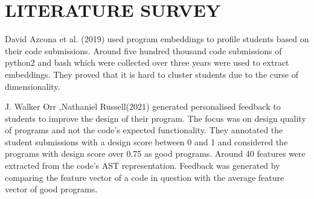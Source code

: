
\chapter{LITERATURE SURVEY} %

David Azcona et al. (2019) \cite{A} used program embeddings to profile students based on their code submissions. Around five hundred thousand code submissions of python2 and bash which were collected over three years were used to extract embeddings. They proved that it is hard to cluster students due to the curse of dimensionality. 

J. Walker Orr ,Nathaniel Russell(2021)\cite{T} generated personalised feedback to students to improve the design of their program. The focus was on design quality of programs and not the code's expected functionality. They annotated the student submissions with a design score between 0 and 1 and considered the programs with design score over 0.75 as good programs. Around 40 features were extracted from the code's AST representation. Feedback was generated by comparing the feature vector of a code in question with the average feature vector of good programs.
 




